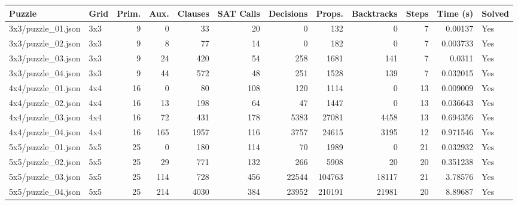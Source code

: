 \begin{tabular}{llrrrrrrrrrl}
\toprule
 Puzzle             & Grid   &   Prim. &   Aux. &   Clauses &   SAT Calls &   Decisions &   Props. &   Backtracks &   Steps &   Time (s) & Solved   \\
\midrule
 3x3/puzzle\_01.json & 3x3    &       9 &      0 &        33 &          20 &           0 &      132 &            0 &       7 &   0.00137  & Yes      \\
 3x3/puzzle\_02.json & 3x3    &       9 &      8 &        77 &          14 &           0 &      182 &            0 &       7 &   0.003733 & Yes      \\
 3x3/puzzle\_03.json & 3x3    &       9 &     24 &       420 &          54 &         258 &     1681 &          141 &       7 &   0.0311   & Yes      \\
 3x3/puzzle\_04.json & 3x3    &       9 &     44 &       572 &          48 &         251 &     1528 &          139 &       7 &   0.032015 & Yes      \\
 4x4/puzzle\_01.json & 4x4    &      16 &      0 &        80 &         108 &         120 &     1114 &            0 &      13 &   0.009009 & Yes      \\
 4x4/puzzle\_02.json & 4x4    &      16 &     13 &       198 &          64 &          47 &     1447 &            0 &      13 &   0.036643 & Yes      \\
 4x4/puzzle\_03.json & 4x4    &      16 &     72 &       431 &         178 &        5383 &    27081 &         4458 &      13 &   0.694356 & Yes      \\
 4x4/puzzle\_04.json & 4x4    &      16 &    165 &      1957 &         116 &        3757 &    24615 &         3195 &      12 &   0.971546 & Yes      \\
 5x5/puzzle\_01.json & 5x5    &      25 &      0 &       180 &         114 &          70 &     1989 &            0 &      21 &   0.032932 & Yes      \\
 5x5/puzzle\_02.json & 5x5    &      25 &     29 &       771 &         132 &         266 &     5908 &           20 &      20 &   0.351238 & Yes      \\
 5x5/puzzle\_03.json & 5x5    &      25 &    114 &       728 &         456 &       22544 &   104763 &        18117 &      21 &   3.78576  & Yes      \\
 5x5/puzzle\_04.json & 5x5    &      25 &    214 &      4030 &         384 &       23952 &   210191 &        21981 &      20 &   8.89687  & Yes      \\
\bottomrule
\end{tabular}
